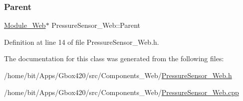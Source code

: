 \subsubsection{\texorpdfstring{Parent}{Parent}}
{\footnotesize\ttfamily \hyperlink{class_module___web}{Module\+\_\+\+Web}$\ast$ Pressure\+Sensor\+\_\+\+Web\+::\+Parent\hspace{0.3cm}{\ttfamily [protected]}}



Definition at line 14 of file Pressure\+Sensor\+\_\+\+Web.\+h.



The documentation for this class was generated from the following files\+:\begin{DoxyCompactItemize}
\item 
/home/bit/\+Apps/\+Gbox420/src/\+Components\+\_\+\+Web/\hyperlink{_pressure_sensor___web_8h}{Pressure\+Sensor\+\_\+\+Web.\+h}\item 
/home/bit/\+Apps/\+Gbox420/src/\+Components\+\_\+\+Web/\hyperlink{_pressure_sensor___web_8cpp}{Pressure\+Sensor\+\_\+\+Web.\+cpp}\end{DoxyCompactItemize}
